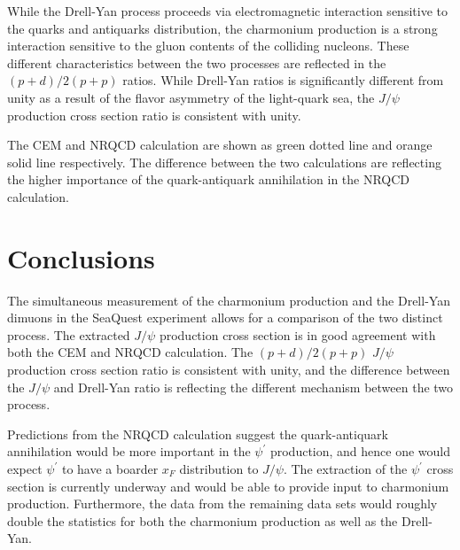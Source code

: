 \documentclass[10pt, a4paper,final]{article}
\begin{document}
While the Drell-Yan process proceeds via electromagnetic interaction sensitive
to the quarks and antiquarks distribution, the charmonium production is a strong
interaction sensitive to the gluon contents of the colliding nucleons. These
different characteristics between the two processes are reflected in the
$(p+d)/2(p+p)$ ratios. While Drell-Yan ratios is significantly different from unity
as a result of the flavor asymmetry of the light-quark sea, the $J/\psi$ production
cross section ratio is consistent with unity.

The CEM and NRQCD calculation are shown as green dotted line and orange solid line
respectively. The difference between the two calculations are reflecting the higher
importance of the quark-antiquark annihilation in the NRQCD calculation.

\section{Conclusions}
The simultaneous measurement of the charmonium production and the Drell-Yan dimuons
in the SeaQuest experiment allows for a comparison of the two distinct process. The
extracted $J/\psi$ production cross section is in good agreement with both the CEM
and NRQCD calculation. The $(p+d)/2(p+p)$ $J/\psi$ production cross section ratio
is consistent with unity, and the difference between the $J/\psi$ and Drell-Yan
ratio is reflecting the different mechanism between the two process.

Predictions from the NRQCD calculation suggest the quark-antiquark annihilation would
be more important in the $\psi^\prime$ production, and hence one would expect $\psi^\prime$
to have a boarder $x_F$ distribution to $J/\psi$. The extraction of the $\psi^\prime$
cross section is currently underway and would be able to provide input to charmonium
production. Furthermore, the data from the remaining data sets would roughly double
the statistics for both the charmonium production as well as the Drell-Yan.

\printbibliography[heading=bibintoc,title={References}]
\listoftodos
\end{document}
